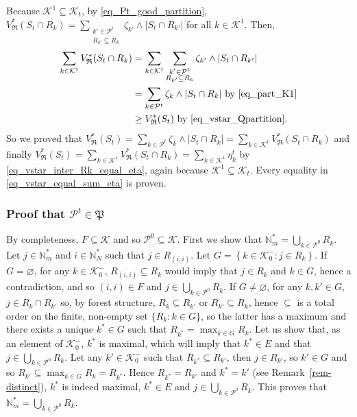 \documentclass[
  11pt,
  a4paper,
]{article}
\theoremstyle{definition}
\theoremstyle{plain}
\theoremstyle{plain}
\theoremstyle{plain}
\theoremstyle{definition}
\theoremstyle{remark}
\begin{document}
Because \(\mathcal{K}^1\subseteq\mathcal{K}_t\), by
\eqref{eq_Pt_good_partition},
\(V^*_{\mathfrak{R}}(S_t\cap R_k) = \sum_{\substack{k'\in \mathcal{P}^t\\ R_{k'}\subseteq R_k}} \zeta_{k'}\wedge|S_t \cap R_{k'}|\)
for all \(k\in\mathcal{K}^1\). Then, \begin{align*}
 \sum_{k\in\mathcal{K}^1} V^*_{\mathfrak{R}}(S_t\cap R_k)&=  \sum_{k\in\mathcal{K}^1}\sum_{\substack{k'\in \mathcal{P}^t\\ R_{k'}\subseteq R_k}} \zeta_{k'}\wedge|S_t \cap R_{k'}|\\
 &=\sum_{k\in\mathcal{P}^t} \zeta_{k}\wedge |S_t\cap R_{k}| \text{ by \eqref{eq_part_K1}}\\
 &\geq V^*_{\mathfrak{R}}(S_t) \text{ by \eqref{eq_vstar_Qpartition}}.\\
\end{align*} So we proved that
\(V^*_{\mathfrak{R}}(S_t)= \sum_{k\in\mathcal{P}^t} \zeta_{k}\wedge |S_t\cap R_{k}|= \sum_{k\in\mathcal{K}^1} V^*_{\mathfrak{R}}(S_t\cap R_k)\)
and finally
\(V^*_{\mathfrak{R}}(S_t)=\sum_{k\in\mathcal{K}^1} V^*_{\mathfrak{R}}(S_t\cap R_k)= \sum_{k\in\mathcal{K}^1}  \eta_k^t\)
by \eqref{eq_vstar_inter_Rk_equal_eta}, again because
\(\mathcal{K}^1\subseteq\mathcal{K}_t\). Every equality in
\eqref{eq_vstar_equal_sum_eta} is proven.

\subsubsection{\texorpdfstring{Proof that
\(\mathcal{P}^t\in\mathfrak P\)}{Proof that \textbackslash mathcal\{P\}\^{}t\textbackslash in\textbackslash mathfrak P}}\label{proof-that-mathcalptinmathfrak-p}

By completeness, \(F\subseteq \mathcal{K}\) and so
\(\mathcal{P}^0\subseteq \mathcal{K}\). First we show that
\(\mathbb{N}_m^*=\bigcup_{k\in\mathcal{P}^0}R_k\). Let
\(j\in\mathbb{N}_m^*\) and \(i\in \mathbb{N}_N^*\) such that
\(j\in R_{(i,i)}\). Let
\(G=\left\{k\in\mathcal{K}_0^-: j\in R_k\right\}\). If
\(G=\varnothing\), for any \(k\in\mathcal{K}_0^-\),
\(R_{(i,i)}\subseteq R_k\) would imply that \(j\in R_k\) and \(k\in G\),
hence a contradiction, and so \((i,i)\in F\) and
\(j\in \bigcup_{k\in\mathcal{P}^0}R_k\). If \(G\neq\varnothing\), for
any \(k,k'\in G\), \(j\in R_{k}\cap R_{k'}\) so, by forest structure,
\(R_{k}\subseteq R_{k'}\) or \(R_{k'}\subseteq R_{k}\), hence
\(\subseteq\) is a total order on the finite, non-empty set
\(\{R_k : k\in G\}\), so the latter has a maximum and there exists a
unique \(k^*\in G\) such that \(R_{k^*}=\max_{k\in G}R_k\). Let us show
that, as an element of \(\mathcal{K}_0^-\), \(k^*\) is maximal, which
will imply that \(k^*\in E\) and that
\(j\in \bigcup_{k\in\mathcal{P}^0}R_k\). Let any
\(k'\in \mathcal{K}_0^-\) such that \(R_{k^*}\subseteq R_{k'}\), then
\(j\in R_{k'}\), so \(k'\in G\) and so
\(R_{k'}\subseteq \max_{k\in G}R_k=R_{k^*}\). Hence \(R_{k^*}= R_{k'}\)
and \(k^*=k'\) (see Remark~\ref{rem-distinct}), \(k^*\) is indeed
maximal, \(k^*\in E\) and \(j\in \bigcup_{k\in\mathcal{P}^0}R_k\). This
proves that \(\mathbb{N}_m^*=\bigcup_{k\in\mathcal{P}^0}R_k\).
\end{document}
